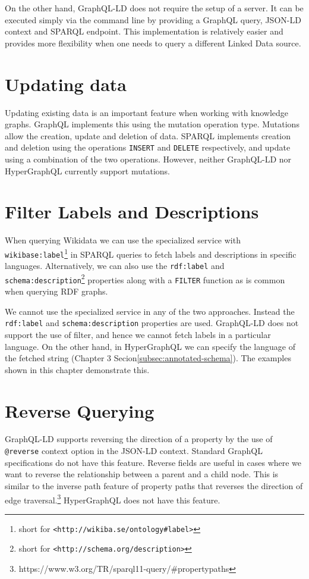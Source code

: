 On the other hand, GraphQL-LD does not require the setup of a server. It can be executed simply via the command line by providing a GraphQL query, JSON-LD context and SPARQL endpoint. This implementation is relatively easier and provides more flexibility when one needs to query a different Linked Data source. 


\section{Updating data}
Updating existing data is an important feature when working with knowledge graphs. GraphQL implements this using the mutation operation type. Mutations allow the creation, update and deletion of data. SPARQL implements creation and deletion using the operations \texttt{INSERT} and \texttt{DELETE} respectively, and update using a combination of the two operations. However, neither GraphQL-LD nor HyperGraphQL currently support mutations.  


\section{Filter Labels and Descriptions}
When querying Wikidata we can use the specialized service with \texttt{wikibase:label}\footnote{short for \texttt{<http://wikiba.se/ontology\#label>}} in SPARQL queries to fetch labels and descriptions in specific languages. Alternatively, we can also use the \texttt{rdf:label} and \texttt{schema:description}\footnote{short for \texttt{<http://schema.org/description>}} properties along with a \texttt{FILTER} function as is common when querying RDF graphs. 

We cannot use the specialized service in any of the two approaches. Instead the \texttt{rdf:label} and \texttt{schema:description} properties are used. GraphQL-LD does not support the use of filter, and hence we cannot fetch labels in a particular language. On the other hand, in HyperGraphQL we can specify the language of the fetched string (Chapter 3 Secion\ref{subsec:annotated-schema}). The examples shown in this chapter demonstrate this.

\section{Reverse Querying}
\label{sec:reverse}
GraphQL-LD supports reversing the direction of a property by the use of \texttt{@reverse} context option in the JSON-LD context. Standard GraphQL specifications do not have this feature. Reverse fields are useful in cases where we want to reverse the relationship between a parent and a child node. This is similar to the inverse path feature of property paths that reverses the direction of edge traversal.\footnote{https://www.w3.org/TR/sparql11-query/\#propertypaths} HyperGraphQL does not have this feature.

